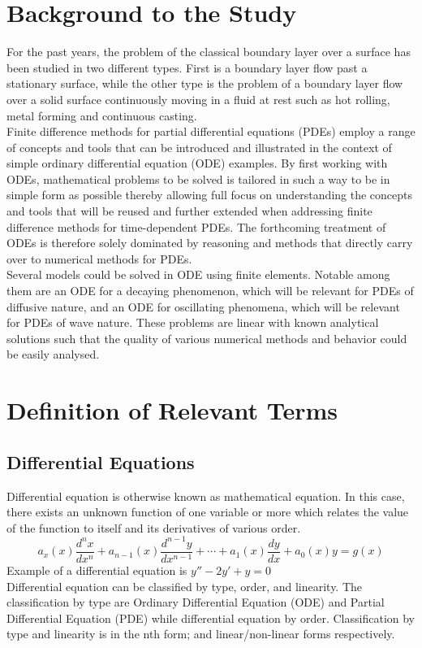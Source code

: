 \documentclass[12pt]{report}
\newcommand{\sps}{\\[0.2cm]}
\newcommand{\sprime}{'}
\newcommand{\dprime}{''}
\begin{document}
	\section{Background to the Study}
	For the past years, the problem of the classical boundary layer over a surface has been studied in two different types. First is a boundary layer flow past a stationary surface, while the other type is
	the problem of a boundary layer flow over a solid surface continuously moving in a fluid at rest such as hot rolling, metal forming and continuous casting.\sps
	Finite difference methods for partial differential equations (PDEs) employ a range of concepts and tools that can be introduced and illustrated in the context of simple ordinary differential equation
	(ODE) examples. By first working with ODEs, mathematical problems to be solved is tailored in such a way to be in simple form as possible thereby allowing full focus on understanding the concepts and tools that will be reused and further extended when addressing finite difference methods for time-dependent PDEs. The forthcoming treatment of ODEs is therefore solely dominated by reasoning and methods that directly carry over to numerical methods for PDEs.\sps
	Several models could be solved in ODE using finite elements. Notable among them are an ODE for a decaying phenomenon, which will be relevant for PDEs of diffusive nature, and an ODE for oscillating phenomena, which will be relevant for PDEs of wave nature. These problems are linear with known analytical solutions such that the quality of various numerical methods and behavior
	could be easily analysed.
	
	\section{Definition of Relevant Terms}
	
	\subsection{Differential Equations}
	Differential equation is otherwise known as mathematical equation. In this case, there exists an unknown function of one variable or more which relates the value of the function to itself and its derivatives of various order.
	\begin{equation}
		a_x(x)\frac{d^nx}{dx^n} + a_{n-1}(x)\frac{d^{n-1}y}{dx^{n-1}} + \cdots + a_1(x)\frac{dy}{dx} + a_0(x)y = g(x) \label{eq:1_1}
	\end{equation}
	Example of a differential equation is $y\dprime -2y\sprime + y = 0$\sps
	Differential equation can be classified by type, order, and linearity. The classification by type are Ordinary Differential Equation (ODE) and Partial Differential Equation (PDE) while differential equation by order. Classification by type and linearity is in the nth form; and linear/non-linear forms respectively.
	\newpage
	
\end{document}
